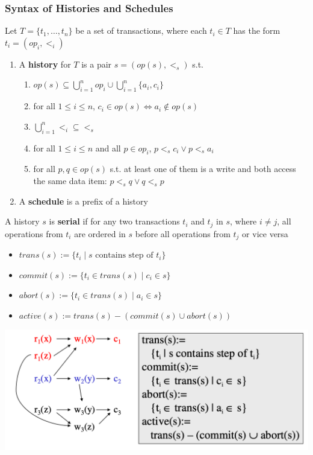 \documentclass[11pt]{article}
\begin{document}
\subsubsection{Syntax of Histories and Schedules}
\label{sec:org6222a9e}
\begin{definition}
Let \(T=\{t_1,\dots,t_n\}\) be a set of transactions, where each \(t_i\in T\) has the form
\(t_i=(op_i,<_i)\)
\begin{enumerate}
\item A \textbf{history} for \(T\) is a pair \(s=(op(s),<_s)\) s.t.
\begin{enumerate}
\item \(op(s)\subseteq\bigcup_{i=1}^nop_i\cup\bigcup_{i=1}^n\{a_i,c_i\}\)
\item for all \(1\le i\le n\), \(c_i\in op(s)\Leftrightarrow a_i\notin op(s)\)
\item \(\bigcup_{i=1}^n<_i\subseteq<_s\)
\item for all \(1\le i\le n\) and all \(p\in op_i\), \(p<_sc_i\vee p<_sa_i\)
\item for all \(p,q\in op(s)\) s.t. at least one of them is a write and both access the same
data item: \(p<_sq\vee q<_sp\)
\end{enumerate}
\item A \textbf{schedule} is a prefix of a history
\end{enumerate}
\end{definition}

\begin{definition}[]
A history \(s\) is \textbf{serial} if for any two transactions \(t_i\) and \(t_j\) in \(s\),
where \(i\neq j\), all operations from \(t_i\) are ordered in \(s\) before all operations
from \(t_j\) or vice versa
\end{definition}

\begin{definition}[]
\begin{itemize}
\item \(trans(s):=\{t_i\mid s\text{ contains step of }t_i\}\)
\item \(commit(s):=\{t_i\in trans(s)\mid c_i\in s\}\)
\item \(abort(s):=\{t_i\in trans(s)\mid a_i\in s\}\)
\item \(active(s):=trans(s)-(commit(s)\cup abort(s))\)
\end{itemize}
\end{definition}


\begin{center}
\includegraphics[width=.8\textwidth]{../images/bigdatabase/6.png}
\label{}
\end{center}
\end{document}
